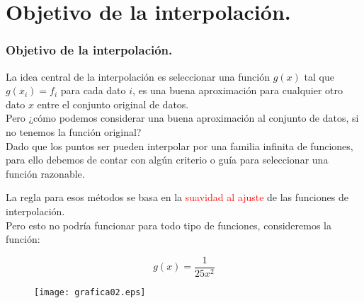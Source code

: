 \section{Objetivo de la interpolación.}
\begin{frame}
\frametitle{Objetivo de la interpolación.}
La idea central de la interpolación es seleccionar una función $g(x)$ tal que $g(x_{i}) = f_{i}$ para cada dato $i$, es una buena aproximación para cualquier otro dato $x$ entre el conjunto original de datos.
\\
\bigskip
Pero ¿cómo podemos considerar una buena aproximación al conjunto de datos, si no tenemos la función original?
\\
\bigskip
Dado que los puntos ser pueden interpolar por una familia infinita de funciones, para ello debemos de contar con algún criterio o guía para seleccionar una función razonable.
\end{frame}
\begin{frame}
La regla para esos métodos se basa en la \textcolor{red}{suavidad al ajuste} de las funciones de interpolación.
\\
\bigskip
Pero esto no podría funcionar para todo tipo de funciones, consideremos la función:
\\
\medskip
\begin{minipage}{3cm}
\[g(x) = \dfrac{1}{25 x^{2}}\]
\end{minipage}
\hspace{0.5cm}
\begin{minipage}{6cm}
\begin{figure}
	\centering
	 \texttt{[image: grafica02.eps]}  
\end{figure}
\end{minipage}
\end{frame}
